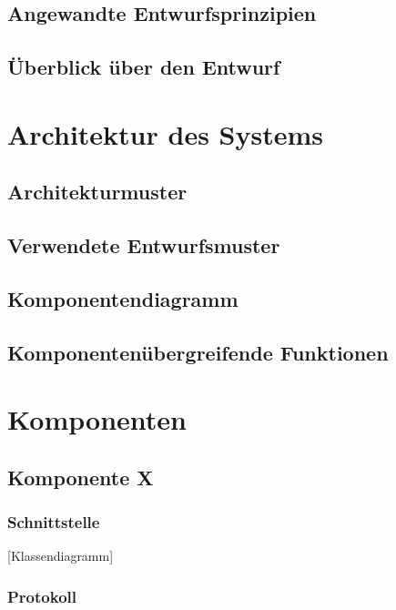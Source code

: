 \documentclass[11pt]{article}
\begin{document}
\subsection{Angewandte Entwurfsprinzipien}

\subsection{Überblick über den Entwurf}

\section{Architektur des Systems}

\subsection{Architekturmuster}

\subsection{Verwendete Entwurfsmuster}

\subsection{Komponentendiagramm}

\subsection{Komponentenübergreifende Funktionen}

\section{Komponenten}

\subsection{Komponente X}

\subsubsection{Schnittstelle}

[Klassendiagramm]

\subsubsection{Protokoll}
\end{document}
